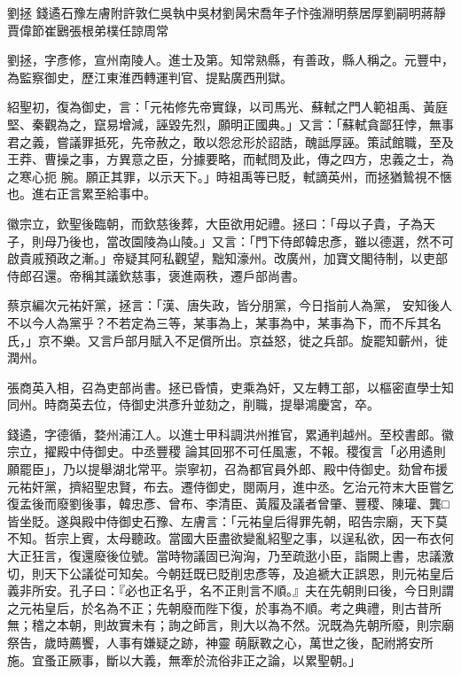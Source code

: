
\begin{pinyinscope}

 劉拯
 錢遹石豫左膚附許敦仁吳執中吳材劉昺宋喬年子忭強淵明蔡居厚劉嗣明蔣靜賈偉節崔鶠張根弟樸任諒周常



 劉拯，字彥修，宣州南陵人。進士及第。知常熟縣，有善政，縣人稱之。元豐中，為監察御史，歷江東淮西轉運判官、提點廣西刑獄。



 紹聖初，復為御史，言：「元祐修先帝實錄，以司馬光、蘇軾之門人範祖禹、黃庭堅、秦觀為之，竄易增減，誣毀先烈，願明正國典。」又言：「蘇軾貪鄙狂悖，無事君之義，嘗議罪抵死，先帝赦之，敢以怨忿形於詔誥，醜詆厚誣。策試館職，至及王莽、曹操之事，方異意之臣，分據要略，而軾問及此，傳之四方，忠義之士，為之寒心扼
 腕。願正其罪，以示天下。」時祖禹等已貶，軾謫英州，而拯猶鷙視不愜也。進右正言累至給事中。



 徽宗立，欽聖後臨朝，而欽慈後葬，大臣欲用妃禮。拯曰：「母以子貴，子為天子，則母乃後也，當改園陵為山陵。」又言：「門下侍郎韓忠彥，雖以德選，然不可啟貴戚預政之漸。」帝疑其阿私觀望，黜知濠州。改廣州，加寶文閣待制，以吏部侍郎召還。帝稱其議欽慈事，褒進兩秩，遷戶部尚書。



 蔡京編次元祐奸黨，拯言：「漢、唐失政，皆分朋黨，今日指前人為黨，
 安知後人不以今人為黨乎？不若定為三等，某事為上，某事為中，某事為下，而不斥其名氏，」京不樂。又言戶部月賦入不足償所出。京益怒，徙之兵部。旋罷知蘄州，徙潤州。



 張商英入相，召為吏部尚書。拯已昏憒，吏乘為奸，又左轉工部，以樞密直學士知同州。時商英去位，侍御史洪彥升並劾之，削職，提舉鴻慶宮，卒。



 錢遹，字德循，婺州浦江人。以進士甲科調洪州推官，累通判越州。至校書郎。徽宗立，擢殿中侍御史。中丞豐稷
 論其回邪不可任風憲，不報。稷復言「必用遹則願罷臣」，乃以提舉湖北常平。崇寧初，召為都官員外郎、殿中侍御史。劾曾布援元祐奸黨，擠紹聖忠賢，布去。遷侍御史，閱兩月，進中丞。乞治元符末大臣嘗乞復孟後而廢劉後事，韓忠彥、曾布、李清臣、黃履及議者曾肇、豐稷、陳瓘、龔□皆坐貶。遂與殿中侍御史石豫、左膚言：「元祐皇后得罪先朝，昭告宗廟，天下莫不知。哲宗上賓，太母聽政。當國大臣盡欲變亂紹聖之事，以逞私欲，因一布衣何
 大正狂言，復還廢後位號。當時物議固已洶洶，乃至疏逖小臣，詣闕上書，忠議激切，則天下公議從可知矣。今朝廷既已貶削忠彥等，及追褫大正誤恩，則元祐皇后義非所安。孔子曰：『必也正名乎，名不正則言不順。』夫在先朝則曰後，今日則謂之元祐皇后，於名為不正；先朝廢而陛下復，於事為不順。考之典禮，則古昔所無；稽之本朝，則故實未有；詢之師言，則大以為不然。況既為先朝所廢，則宗廟祭告，歲時薦饗，人事有嫌疑之跡，神靈
 萌厭斁之心，萬世之後，配祔將安所施。宜蚤正厥事，斷以大義，無牽於流俗非正之論，以累聖朝。」




\end{pinyinscope}
